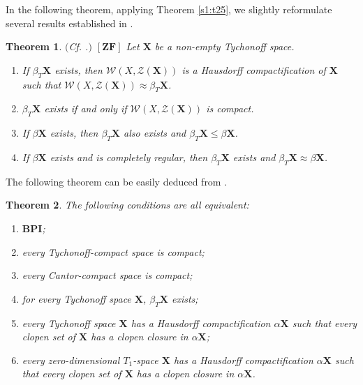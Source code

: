 \documentclass[12pt,twoside,leqno]{article}
\theoremstyle{plain}
\newtheorem{theorem}{Theorem}[section]
\theoremstyle{definition}
\theoremstyle{remark}
\begin{document}
In the following theorem, applying Theorem \ref{s1:t25}, we slightly reformulate several results established in  \cite[Section 3]{kw1}.

\begin{theorem}
	\label{s1:t29}
	$($Cf. \cite[Section 3]{kw1}.$)$ $[\mathbf{ZF}]$ Let $\mathbf{X}$ be a non-empty Tychonoff space. 
	\begin{enumerate}
		\item[(i)] If $\beta_{T}\mathbf{X}$ exists, then $\mathcal{W}(X, \mathcal{Z}(\mathbf{X}))$ is a Hausdorff compactification of $\mathbf{X}$ such that $\mathcal{W}(X, \mathcal{Z}(\mathbf{X}))\approx\beta_{T}\mathbf{X}$.
		\item[(ii)] $\beta_{T}\mathbf{X}$ exists if and only if $\mathcal{W}(X, \mathcal{Z}(\mathbf{X}))$ is compact.
		\item[(iii)] If $\beta\mathbf{X}$ exists, then $\beta_{T}\mathbf{X}$ also exists and $\beta_{T}\mathbf{X}\leq\beta\mathbf{X}$.
		\item[(iv)] If $\beta\mathbf{X}$ exists and is completely regular, then $\beta_{T}\mathbf{X}$ exists and $\beta_{T}\mathbf{X}\approx\beta\mathbf{X}$.
	\end{enumerate}
\end{theorem}

The following theorem can be easily deduced from \cite[Theorem 3.16]{kw1}.

\begin{theorem} 
	\label{s1:t30}
	The following conditions are all equivalent:
	\begin{enumerate}
		\item[(i)] $\mathbf{BPI}$;
		\item[(ii)] every Tychonoff-compact space is compact;
		\item[(iii)] every Cantor-compact space is compact;
		\item[(iv)] for every Tychonoff space $\mathbf{X}$, $\beta_{T}\mathbf{X}$ exists;
		\item[(v)] every Tychonoff space $\mathbf{X}$ has a Hausdorff compactification $\alpha\mathbf{X}$ such that every clopen set of $\mathbf{X}$ has a clopen closure in $\alpha\mathbf{X}$;
		\item[(vi)] every zero-dimensional $T_1$-space $\mathbf{X}$ has a Hausdorff compactification $\alpha\mathbf{X}$ such that every clopen set of $\mathbf{X}$ has a clopen closure in $\alpha\mathbf{X}$.
	\end{enumerate}
\end{theorem}
\end{document}
